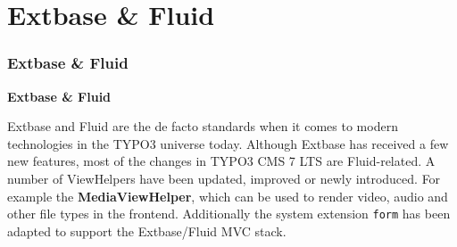 %

\section{Extbase \& Fluid}
\begin{frame}[fragile]
	\frametitle{Extbase \& Fluid}

	\begin{center}\huge{\color{typo3darkgrey}\textbf{Extbase \& Fluid}}\end{center}

	Extbase and Fluid are the de facto standards when it comes to modern technologies in
	the TYPO3 universe today. Although Extbase has received a few new features, most of
	the changes in TYPO3 CMS 7 LTS are Fluid-related.\newline
	A number of ViewHelpers have been updated, improved or newly introduced. For example
	the \textbf{MediaViewHelper}, which can be used to render video, audio and other file
	types in the frontend.\newline
	Additionally the system extension \texttt{form} has been adapted to support the
	Extbase/Fluid MVC stack.

\end{frame}

